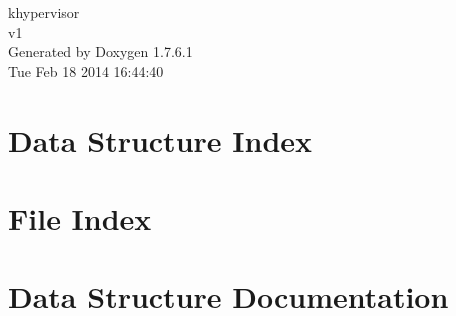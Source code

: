 \documentclass[a4paper]{book}
\begin{document}
\hypersetup{pageanchor=false,citecolor=blue}
\begin{titlepage}
\vspace*{7cm}
\begin{center}
{\Large khypervisor \\[1ex]\large v1 }\\
\vspace*{1cm}
{\large \-Generated by Doxygen 1.7.6.1}\\
\vspace*{0.5cm}
{\small Tue Feb 18 2014 16:44:40}\\
\end{center}
\end{titlepage}
\clearemptydoublepage
{}
\tableofcontents
\clearemptydoublepage
{}
\hypersetup{pageanchor=true,citecolor=blue}
\chapter{\-Data \-Structure \-Index}

\chapter{\-File \-Index}

\chapter{\-Data \-Structure \-Documentation}
































\end{document}

